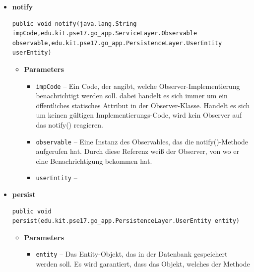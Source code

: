 \documentclass[11pt,a4paper]{article}
\begin{document}
{{{{{{{{{{{{{{{\begin{itemize}
{\begin{itemize}
{}%
\end{itemize}
}%
\item{ 
\hypertarget{edu.kit.pse17.go_app.PersistenceLayer.daos.UserDaoImp.notify(java.lang.String, edu.kit.pse17.go_app.ServiceLayer.Observable, edu.kit.pse17.go_app.PersistenceLayer.UserEntity)}{{\bf  notify}\\}
\begin{lstlisting}[frame=none]
public void notify(java.lang.String impCode,edu.kit.pse17.go_app.ServiceLayer.Observable observable,edu.kit.pse17.go_app.PersistenceLayer.UserEntity userEntity)\end{lstlisting} %
\begin{itemize}
\item{
{\bf  Parameters}
  \begin{itemize}
   \item{
\texttt{impCode} -- Ein Code, der angibt, welche Observer-Implementierung benachrichtigt werden soll. dabei handelt es sich immer um ein öffentliches statisches Attribut in der Observer-Klasse. Handelt es sich um keinen gültigen Implementierungs-Code, wird kein Observer auf das notify() reagieren.}
   \item{
\texttt{observable} -- Eine Instanz des Observables, das die notify()-Methode aufgerufen hat. Durch diese Referenz weiß der Observer, von wo er eine Benachrichtigung bekommen hat.}
   \item{
\texttt{userEntity} -- }
  \end{itemize}
}%
\end{itemize}
}%
\item{ 
\hypertarget{edu.kit.pse17.go_app.PersistenceLayer.daos.UserDaoImp.persist(edu.kit.pse17.go_app.PersistenceLayer.UserEntity)}{{\bf  persist}\\}
\begin{lstlisting}[frame=none]
public void persist(edu.kit.pse17.go_app.PersistenceLayer.UserEntity entity)\end{lstlisting} %
\begin{itemize}
\item{
{\bf  Parameters}
  \begin{itemize}
   \item{
\texttt{entity} -- Das Entity-Objekt, das in der Datenbank gespeichert werden soll. Es wird garantiert, dass das Objekt, welches der Methode}
  \end{itemize}
}%

\end{itemize}}
\end{itemize}}}}}}}}}}}}}}}}
\end{document}
